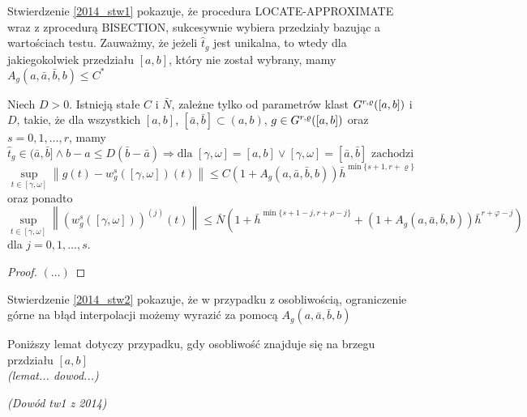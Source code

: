 \documentclass[oik, pdftex, robocza, man]{mgrwms}
\begin{document}
    \begin{uw}
        Stwierdzenie \ref{2014_stw1} pokazuje, że procedura LOCATE-APPROXIMATE wraz z zprocedurą BISECTION, sukcesywnie wybiera przedziały bazując a wartościach testu. Zauważmy, że jeżeli $\hat{t}_{g}$ jest unikalna, to wtedy dla jakiegokolwiek przedziału $[a,b]$, który nie został wybrany, mamy $A_{g}(a, \bar{a}, \bar{b}, b) \leq C^{*}$
    \end{uw}

    \begin{stw}
        \label{2014_stw2}
        Niech $D > 0$. Istnieją stałe $C$ i $\bar{N}$, zależne tylko od parametrów klast $G^{r,\varrho}([a,b])$ i $D$, takie, że dla wszystkich $[a,b]$, $[\bar{a}, \bar{b}] \subset (a,b)$, $g \in G^{r,\varrho}([a,b])$ oraz $s=0,1,\dots,r$, mamy
        \begin{equation*}
            \hat{t}_{g} \in (\bar{a}, \bar{b}] \land b-a \leq D(\bar{b}-\bar{a}) \Longrightarrow \text{dla } [\gamma, \omega]=[a, b] \vee [\gamma, \omega]=[\bar{a}, \bar{b}] \text{ zachodzi }
        \end{equation*}
        \begin{equation*}
            \sup _{t \in[\gamma, \omega]}\left\|g(t)-w_{g}^{s}([\gamma, \omega])(t)\right\| \leq C\left(1+A_{g}(a, \bar{a}, \bar{b}, b)\right) \bar{h}^{\min \{s+1, r+\varrho\}}
        \end{equation*}
        oraz ponadto
        \begin{equation*}
            \sup _{t \in[\gamma, \omega]}\left\|\left(w_{g}^{s}([\gamma, \omega])\right)^{(j)}(t)\right\| \leq \bar{N}\left(1+\bar{h}^{\min \{s+1-j, r+\rho-j\}}+\left(1+A_{g}(a, \bar{a}, \bar{b}, b)\right) \bar{h}^{r+\varphi-j}\right)
        \end{equation*}
        dla $j=0,1,\dots,s$.
    \end{stw}
    \begin{proof}
        $(\dots)$
    \end{proof}

    \begin{uw}
        Stwierdzenie \ref{2014_stw2} pokazuje, że w przypadku z osobliwością, ograniczenie górne na błąd interpolacji możemy wyrazić za pomocą $A_{g}(a, \bar{a}, \bar{b}, b)$
    \end{uw}

    Poniższy lemat dotyczy przypadku, gdy osobliwość znajduje się na brzegu przdziału $[a,b]$\\
    \textit{(lemat... dowod...)}

    \textit{(Dowód tw1 z 2014)}
\end{document}
